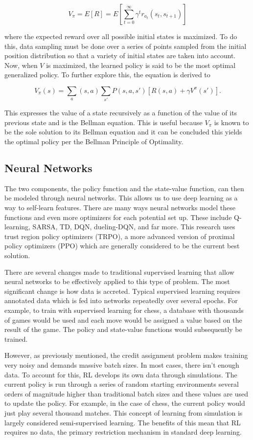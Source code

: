 \documentclass{article}
\begin{document}
$$V_\pi = E[R] = E[\sum_{t=0}^{\infty} \gamma^t r_{a_t}(s_t,s_{t+1})]$$

where the expected reward over all possible initial states is maximized. To do this, data sampling must be done over a series of points sampled from the initial position distribution so that a variety of initial states are taken into account. Now, when $V$ is maximized, the learned policy is said to be the most optimal generalized policy. To further explore this, the equation is derived to

$$V_\pi(s) = \sum_a(s,a)\sum_{s'}P(s, a, s')[R(s, a) + \gamma V^\pi(s')].$$

This expresses the value of a state recursively as a function of the value of its previous state and is the Bellman equation. This is useful because $V_\pi$ is known to be the sole solution to its Bellman equation and it can be concluded this yields the optimal policy per the Bellman Principle of Optimality.

\subsection{Neural Networks}
The two components, the policy function and the state-value function, can then be modeled through neural networks. This allows us to use deep learning as a way to self-learn features. There are many ways neural networks model these functions and even more optimizers for each potential set up. These include Q-learning, SARSA, TD, DQN, dueling-DQN, and far more. This research uses trust region policy optimizers (TRPO), a more advanced version of proximal policy optimizers (PPO) which are generally considered to be the current best solution.

There are several changes made to traditional supervised learning that allow neural networks to be effectively applied to this type of problem. The most significant change is how data is accreted. Typical supervised learning requires annotated data which is fed into networks repeatedly over several epochs. For example, to train with supervised learning for chess, a database with thousands of games would be used and each move would be assigned a value based on the result of the game. The policy and state-value functions would subsequently be trained. 

However, as previously mentioned, the credit assignment problem makes training very noisy and demands massive batch sizes. In most cases, there isn’t enough data. To account for this, RL develops its own data through simulations. The current policy is run through a series of random starting environments several orders of magnitude higher than traditional batch sizes and these values are used to update the policy. For example, in the case of chess, the current policy would just play several thousand matches. This concept of learning from simulation is largely considered semi-supervised learning. The benefits of this mean that RL requires no data, the primary restriction mechanism in standard deep learning.
\end{document}
